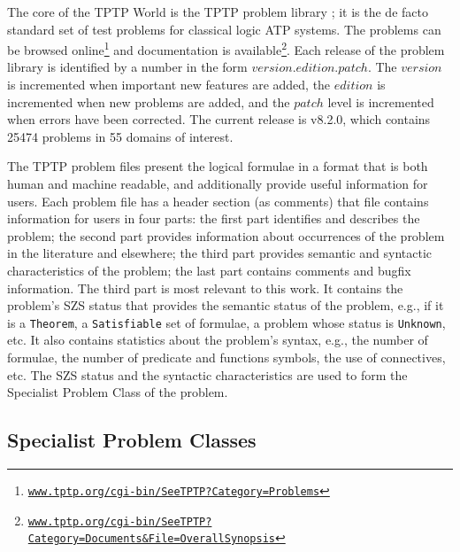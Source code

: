 \documentclass[runningheads]{llncs}
\begin{document}
The core of the TPTP World is the TPTP problem library \cite{Sut09}; it is the de facto standard 
set of test problems for classical logic ATP systems.
The problems can be browsed online\footnote{%
\href{https://www.tptp.org/cgi-bin/SeeTPTP?Category=Problems}
{\tt www.tptp.org/cgi-bin/SeeTPTP?Category=Problems}}
and documentation is available\footnote{%
\href{https://www.tptp.org/cgi-bin/SeeTPTP?Category=Documents\&File=OverallSynopsis}
{\tt www.tptp.org/cgi-bin/SeeTPTP?Category=Documents\&File=OverallSynopsis}}.
Each release of the problem library is identified by a number in the form 
$version$.$edition$.$patch$.
The $version$ is incremented when important new features are added,
the $edition$ is incremented when new problems are added, and
the $patch$ level is incremented when errors have been corrected.
The current release is v8.2.0, which contains 25474 problems in 55 domains of interest.

The TPTP problem files present the logical formulae in a format that is both human and machine 
readable, and additionally provide useful information for users.
Each problem file has a header section (as comments) that file contains information for users
in four parts:
the first part identifies and describes the problem;
the second part provides information about occurrences of the problem in the literature and 
elsewhere;
the third part provides semantic and syntactic characteristics of the problem;
the last part contains comments and bugfix information.
The third part is most relevant to this work. 
It contains the problem's SZS status \cite{SZS03} that provides the semantic status of the 
problem, e.g., if it is a {\tt Theorem}, a {\tt Satisfiable} set of formulae, a problem whose 
status is {\tt Unknown}, etc.
It also contains statistics about the problem's syntax, e.g., the number of formulae, the 
number of predicate and functions symbols, the use of connectives, etc.
The SZS status and the syntactic characteristics are used to form the Specialist Problem Class
of the problem.

\subsection{Specialist Problem Classes}
\label{SPCs}
\end{document}
